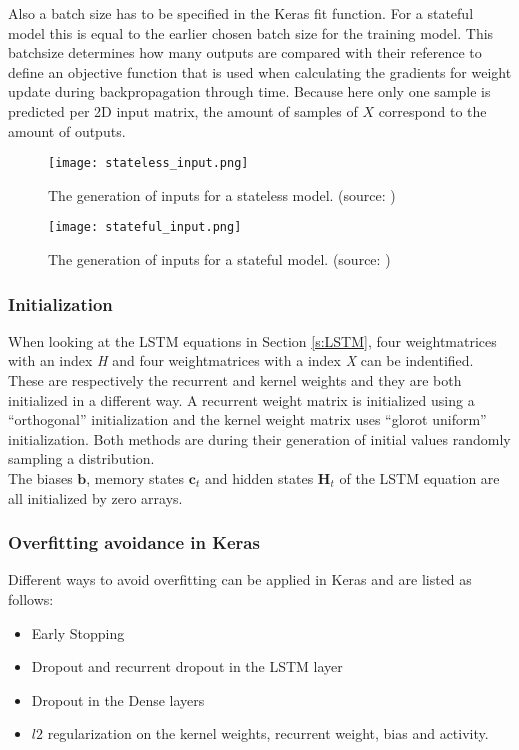 Also a batch size has to be specified in the Keras fit function. For a stateful model this is equal to the earlier chosen batch size for the training model. This batchsize determines how many outputs are compared with their reference to define an objective function that is used when calculating the gradients for weight update during backpropagation through time. Because here only one sample is predicted per 2D input matrix, the amount of samples of $ X $ correspond to the amount of outputs.\\

\begin{figure}[h]
	\centering
	\texttt{[image: stateless\_input.png]}
	\caption{The generation of inputs for a stateless model. (source: \cite{FneishMo})}
	\label{fig:stateless_input}
\end{figure}

\begin{figure}[h]
	\centering
	\texttt{[image: stateful\_input.png]}
	\caption{The generation of inputs for a stateful model. (source: \cite{FneishMo})}
	\label{fig:stateful_input}
\end{figure}

\subsubsection{Initialization}
When looking at the LSTM equations in Section \ref{s:LSTM}, four weightmatrices with an index \textit{H} and four weightmatrices with a index \textit{X} can be indentified. These are respectively the recurrent and kernel weights and they are both initialized in a different way. A recurrent weight matrix is initialized using a ``orthogonal'' initialization and the kernel weight matrix uses ``glorot uniform'' initialization. Both methods are during their generation of initial values randomly sampling a distribution.\\

The biases $ \bm{b} $, memory states $ \bm{c}_t $ and hidden states $ \bm{H}_t $ of the LSTM equation are all initialized by zero arrays.\\


\subsubsection{Overfitting avoidance in Keras}
Different ways to avoid overfitting can be applied in Keras and are listed as follows:
\begin{itemize}
	\item Early Stopping
	\item Dropout and recurrent dropout in the LSTM layer
	\item Dropout in the Dense layers
	\item $ l2 $ regularization on the kernel weights, recurrent weight, bias and activity.
\end{itemize}

